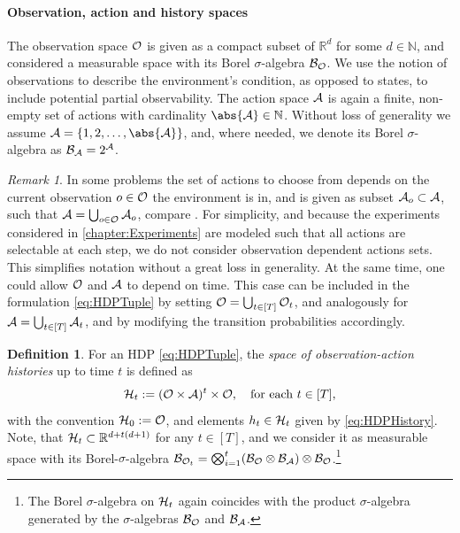 \documentclass[
    a4paper,
    11pt,
    bibliography=totoc,
    listof=totoc,      
    headinclude=true,
    cleardoublepage=empty,
]{scrbook}
\theoremstyle{plain}
\theoremstyle{definition}
\newtheorem{definition}[theorem]{Definition}
\theoremstyle{remark}
\newtheorem{remark}[theorem]{Remark}
\newcommand{\SetR}{\mathbb R}
\newcommand{\SetN}{\mathbb N}
\newcommand{\SpaceA}{{\cal A}}
\newcommand{\SpaceO}{{\cal O}}
\newcommand{\SpaceH}{{\cal H}}
\begin{document}
\paragraph{Observation, action and history spaces}
The observation space $\SpaceO$ is given as a compact subset of $\SetR^d$ 
for some $d\in\SetN$, and considered a measurable space with its Borel 
$\sigma$-algebra $\mathcal{B}_\SpaceO$. We use the notion of observations to
describe the environment's condition, as opposed to states, to include
potential partial observability. The action space $\SpaceA$ is again a finite, 
non-empty set of actions with cardinality $\abs{\SpaceA}\in\SetN$. Without 
loss of generality we assume $\SpaceA=\{1,2,\dots,\abs{\SpaceA}\}$, and, where 
needed, we denote its Borel $\sigma$-algebra as $\mathcal{B}_\SpaceA = 
2^\SpaceA$.

\begin{remark}
    In some problems the set of actions to choose from depends on the current 
    observation $o\in\SpaceO$ the environment is in, and is given as subset 
    $\SpaceA_{o}\subset\SpaceA$, such that $\SpaceA = \bigcup_{o\in\SpaceO} 
    \SpaceA_o$, compare
    \cite{ning2020_ddqoe, hinderer2016_do, puterman2005_mdpdsdp}. For
    simplicity, and because the experiments considered in 
    \cref{chapter:Experiments} are modeled such that all actions are 
    selectable at each step, we do not consider observation dependent actions 
    sets. This simplifies notation without a great loss in generality.
    At the same time, one could allow $\SpaceO$ and 
    $\SpaceA$ to depend on time. This case can be included in the formulation 
    \eqref{eq:HDPTuple} by setting $\SpaceO = \bigcup_{t\in[T]}\SpaceO_t$, and 
    analogously for $\SpaceA=\bigcup_{t\in[T]}\SpaceA_t$, and by modifying the 
    transition probabilities accordingly.
\end{remark}

\begin{definition}
\label{def:HistorySpaces}
    For an HDP \eqref{eq:HDPTuple}, the \textit{space of observation-action 
    histories} up to time $t$ is defined as
    \[
        \SpaceH_t := (\SpaceO \times \SpaceA)^t \times \SpaceO,
        \quad \text{for each } t \in [T],
    \]
    with the convention $\SpaceH_0 := \SpaceO$, and elements $h_t\in\SpaceH_t$
    given by \eqref{eq:HDPHistory}. Note, that $\SpaceH_t \subset
    \SetR^{d+t(d+1)}$ for any $t\in[T]$, and we consider it as measurable space
    with its Borel-$\sigma$-algebra
    $
        \mathcal{B}_{\SpaceO_t} 
        = \bigotimes_{i=1}^t (
            \mathcal{B}_\SpaceO \otimes \mathcal{B}_\SpaceA
        ) \otimes \mathcal{B}_\SpaceO
    $.\footnote{
        The Borel $\sigma$-algebra on $\SpaceH_t$ again coincides with the
        product $\sigma$-algebra generated by the $\sigma$-algebras 
        $\mathcal{B}_\SpaceO$ and $\mathcal{B}_\SpaceA$.
    }
\end{definition}
\end{document}
